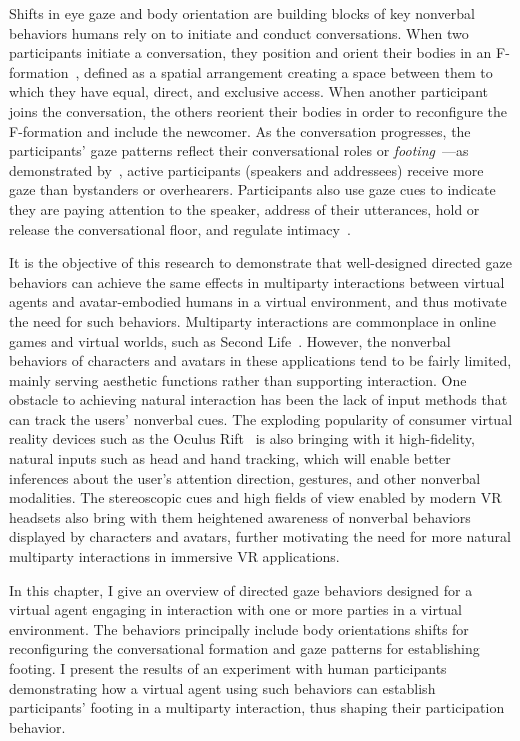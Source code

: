 Shifts in eye gaze and body orientation are building blocks of key nonverbal behaviors humans rely on to initiate and conduct conversations. When two participants initiate a conversation, they position and orient their bodies in an F-formation~\citep{kendon1990conducting}, defined as a spatial arrangement creating a space between them to which they have equal, direct, and exclusive access. When another participant joins the conversation, the others reorient their bodies in order to reconfigure the F-formation and include the newcomer. As the conversation progresses, the participants' gaze patterns reflect their conversational roles or \emph{footing}~\citep{goffman1979footing}---as demonstrated by~\citet{mutlu2012conversational}, active participants (speakers and addressees) receive more gaze than bystanders or overhearers. Participants also use gaze cues to indicate they are paying attention to the speaker, address of their utterances, hold or release the conversational floor, and regulate intimacy~\citep{heylen2006head}.

It is the objective of this research to demonstrate that well-designed directed gaze behaviors can achieve the same effects in multiparty interactions between virtual agents and avatar-embodied humans in a virtual environment, and thus motivate the need for such behaviors. Multiparty interactions are commonplace in online games and virtual worlds, such as Second Life~\citep{secondlife}. However, the nonverbal behaviors of characters and avatars in these applications tend to be fairly limited, mainly serving aesthetic functions rather than supporting interaction. One obstacle to achieving natural interaction has been the lack of input methods that can track the users' nonverbal cues. The exploding popularity of consumer virtual reality devices such as the Oculus Rift~\citep{oculus} is also bringing with it high-fidelity, natural inputs such as head and hand tracking, which will enable better inferences about the user's attention direction, gestures, and other nonverbal modalities. The stereoscopic cues and high fields of view enabled by modern VR headsets also bring with them heightened awareness of nonverbal behaviors displayed by characters and avatars, further motivating the need for more natural multiparty interactions in immersive VR applications.

In this chapter, I give an overview of directed gaze behaviors designed for a virtual agent engaging in interaction with one or more parties in a virtual environment. The behaviors principally include body orientations shifts for reconfiguring the conversational formation and gaze patterns for establishing footing. I present the results of an experiment with human participants demonstrating how a virtual agent using such behaviors can establish participants' footing in a multiparty interaction, thus shaping their participation behavior.
